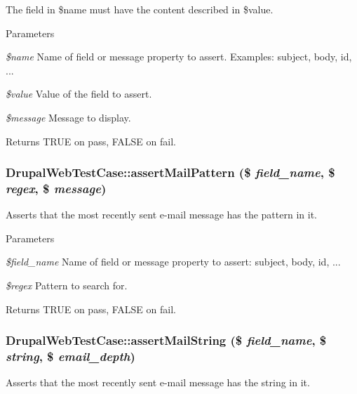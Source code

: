 The field in \$name must have the content described in \$value.


\begin{DoxyParams}{Parameters}
\item[{\em \$name}]Name of field or message property to assert. Examples: subject, body, id, ... \item[{\em \$value}]Value of the field to assert. \item[{\em \$message}]Message to display.\end{DoxyParams}
\begin{DoxyReturn}{Returns}
TRUE on pass, FALSE on fail. 
\end{DoxyReturn}
\hypertarget{classDrupalWebTestCase_a1ed753cc3b38d927ab50b26e6a8dd7b1}{
\subsubsection[{assertMailPattern}]{\setlength{\rightskip}{0pt plus 5cm}DrupalWebTestCase::assertMailPattern (\$ {\em field\_\-name}, \/  \$ {\em regex}, \/  \$ {\em message})}}
\label{classDrupalWebTestCase_a1ed753cc3b38d927ab50b26e6a8dd7b1}
Asserts that the most recently sent e-\/mail message has the pattern in it.


\begin{DoxyParams}{Parameters}
\item[{\em \$field\_\-name}]Name of field or message property to assert: subject, body, id, ... \item[{\em \$regex}]Pattern to search for.\end{DoxyParams}
\begin{DoxyReturn}{Returns}
TRUE on pass, FALSE on fail. 
\end{DoxyReturn}
\hypertarget{classDrupalWebTestCase_afbd0be3cf23c01e113803bf4b475eecc}{
\subsubsection[{assertMailString}]{\setlength{\rightskip}{0pt plus 5cm}DrupalWebTestCase::assertMailString (\$ {\em field\_\-name}, \/  \$ {\em string}, \/  \$ {\em email\_\-depth})}}
\label{classDrupalWebTestCase_afbd0be3cf23c01e113803bf4b475eecc}
Asserts that the most recently sent e-\/mail message has the string in it.



